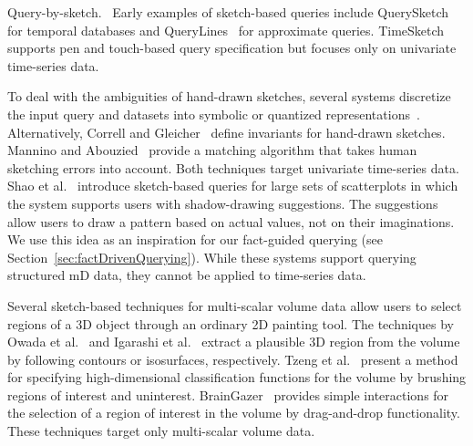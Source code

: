 \textsf{Query-by-sketch.\ } 
Early examples of sketch-based queries include QuerySketch~\cite{Wattenberg2001} for temporal databases and QueryLines~\cite{Ryall2005} for approximate queries. 
TimeSketch~\cite{Eichmann2015} supports pen and touch-based query specification but focuses only on univariate time-series data.

To deal with the ambiguities of hand-drawn sketches, several systems discretize the input query and datasets into symbolic or quantized representations~\cite{Muthumanickam2016,ruta2019sax}.
%
Alternatively, Correll and Gleicher~\cite{Correll2016} define invariants for hand-drawn sketches. %
Mannino and Abouzied~\cite{Mannino2018} provide a matching algorithm that takes human sketching errors into account.
Both techniques target univariate time-series data.
%
Shao et al.~\cite{Shao2014} introduce sketch-based queries for large sets of scatterplots
in which the system supports users with shadow-drawing suggestions. %
The suggestions allow users to draw a pattern based on actual values, not on their imaginations.
We use this idea as an inspiration for our fact-guided querying (see Section~\ref{sec:factDrivenQuerying}).
While these systems support querying structured mD data, they cannot be applied to time-series data.

Several sketch-based techniques for multi-scalar volume data allow users to select regions of a 3D object through an ordinary 2D painting tool.
The techniques by Owada et al.~\cite{Owada2005} and Igarashi et al.~\cite{Igarashi2016} extract a plausible 3D region from the volume
by following contours or isosurfaces, respectively.
Tzeng et al.~\cite{Tzeng2003} present a method for specifying high-dimensional classification functions for the volume
by brushing regions of interest and uninterest. %
BrainGazer~\cite{Bruckner2009} provides simple interactions for the selection of a region of interest in the volume
by drag-and-drop functionality.
These techniques target only multi-scalar volume data. 

